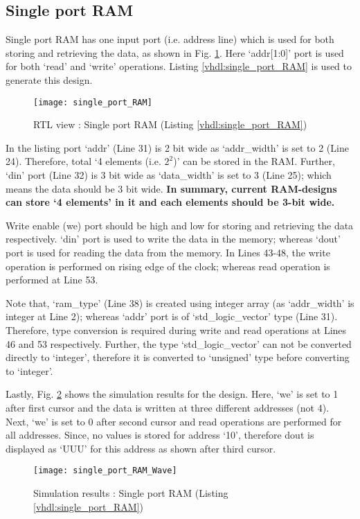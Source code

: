 \subsection{Single port RAM}
Single port RAM has one input port (i.e. address line) which is used for both storing and retrieving the data, as shown in Fig. \ref{fig:single_port_RAM}. Here `addr[1:0]' port is used for both `read' and `write' operations. Listing \ref{vhdl:single_port_RAM} is used to generate this design. 
\begin{figure}[!h]
	\centering
	\texttt{[image: single\_port\_RAM]}
	\caption{RTL view : Single port RAM (Listing \ref{vhdl:single_port_RAM})}
	\label{fig:single_port_RAM}
\end{figure}

\begin{explanation}
	In the listing port `addr' (Line 31) is 2 bit wide as `addr\_width' is set to 2 (Line 24). Therefore, total `4 elements (i.e. $2^2$)' can be stored in the RAM. Further, `din' port (Line 32) is 3 bit wide as `data\_width' is set to 3 (Line 25); which means the data should be 3 bit wide. \textbf{In summary, current RAM-designs can store `4 elements' in it and each elements should be 3-bit wide.}
	
	Write enable (we) port should be high and low for storing and retrieving the data respectively. `din' port is used to write the data in the memory; whereas `dout' port is used for reading the data from the memory. In Lines 43-48, the write operation is performed on rising edge of the clock; whereas read operation is performed at Line 53. 
	
	Note that, `ram\_type' (Line 38) is created using integer array (as `addr\_width' is integer at Line 2); whereas `addr' port is of `std\_logic\_vector' type (Line 31). Therefore, type conversion is required during write and read operations at Lines 46 and 53 respectively. Further, the type `std\_logic\_vector' can not be converted directly to `integer', therefore it is converted to `unsigned' type before converting to `integer'. 
	
	Lastly, Fig. \ref{fig:single_port_RAM_Wave} shows the simulation results for the design. Here, `we' is set to 1 after first cursor and the data is written at three different addresses (not 4). Next, `we' is set to 0 after second cursor and read operations are performed for all addresses. Since, no values is stored for address `10', therefore dout is displayed as `UUU' for this address as shown after third cursor. 
	\begin{figure}[!h]
	\centering
	\texttt{[image: single\_port\_RAM\_Wave]}
	\caption{Simulation results : Single port RAM (Listing \ref{vhdl:single_port_RAM})}
	\label{fig:single_port_RAM_Wave}
	\end{figure}
\end{explanation}

